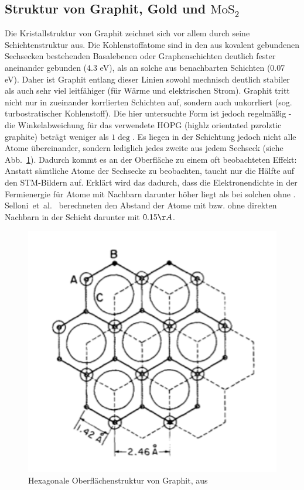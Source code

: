 \subsection{Struktur von Graphit, Gold und $\mathrm{MoS_2}$}
Die Kristallstruktur von Graphit zeichnet sich vor allem durch seine Schichtenstruktur 
aus. Die Kohlenstoffatome sind in den aus kovalent gebundenen Sechsecken bestehenden 
Basalebenen oder Graphenschichten deutlich fester aneinander gebunden (4.3 eV), als 
an solche aus benachbarten Schichten (0.07 eV). Daher ist Graphit entlang dieser Linien 
sowohl mechnisch deutlich stabiler als auch sehr viel leitfähiger (für Wärme und 
elektrischen Strom). Graphit tritt nicht nur in zueinander korrlierten Schichten auf, 
sondern auch unkorrliert (sog. turbostratischer Kohlenstoff). Die hier untersuchte Form 
ist jedoch regelmäßig - die Winkelabweichung für das verwendete HOPG (highlz orientated 
pzrolztic graphite) beträgt weniger als $1 \deg$. Es liegen in der Schichtung jedoch 
nicht alle Atome übereinander, sondern lediglich jedes zweite aus jedem Sechseck (siehe 
Abb.~\ref{fig:graphite}). Dadurch kommt es an der Oberfläche zu einem oft beobachteten 
Effekt: Anstatt sämtliche Atome der Sechsecke zu beobachten, taucht nur die Hälfte auf 
den STM-Bildern auf. Erklärt wird das dadurch, dass die Elektronendichte in der 
Fermienergie für Atome mit Nachbarn darunter höher liegt als bei solchen ohne
\cite{zeinalipour2008new}. Selloni~et~al.~\cite{Sellino1985} berechneten den Abstand 
der Atome mit bzw. ohne direkten Nachbarn in der Schicht darunter mit $0.15 \AA$. 

\begin{figure}
    \includegraphics[width=1.0\textwidth]{pics_theo/graphite}
    \caption{Hexagonale Oberflächenstruktur von Graphit, aus \cite{park1986tunneling}}
    \label{fig:graphite}
\end{figure} 

